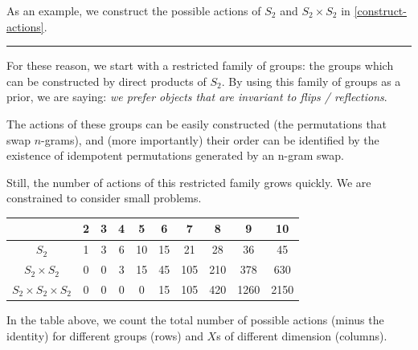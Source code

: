  As an example, we construct the possible actions of $S_2$ and $S_2 \times S_2$ in \ref{construct-actions}.



\begin{center}\rule{0.5\linewidth}{\linethickness}\end{center}

For these reason, we start with a restricted family of groups:
the groups which can be constructed by direct products of $S_2$.
By using this family of groups as a prior, we are saying: \textit{we prefer objects that are invariant to flips / reflections}.

The actions of these groups can be easily constructed (the permutations that swap $n$-grams\footnotemark), and (more importantly)
their order can be identified by the existence of idempotent permutations generated by an n-gram swap.


Still, the number of actions of this restricted family grows quickly. We are constrained to consider small problems.

\begin{changemargin}{-3cm}{-3cm}
  \begin{center}
    \begin{tabular}{ c || c | c | c | c | c | c | c | c | c }
											        & 2 & 3 & 4 & 5  & 6   & 7   & 8   & 9 & 10 \\ \hline \hline
											  $S_2$ & 1 & 3 & 6 & 10 & 15  & 21  & 28  & 36   & 45\\ \hline
					   $S_2 \times S_2$ & 0 & 0 & 3 & 15 & 45  & 105 & 210 & 378  & 630 \\ \hline
	$S_2 \times S_2 \times S_2$ & 0 & 0 & 0 & 0  & 15  & 105 & 420 & 1260 & 2150 \\
    \end{tabular}
  \end{center}
\end{changemargin}

In the table above, we count the total number of possible actions (minus the identity) for
different groups (rows) and $X$s of different dimension (columns).

